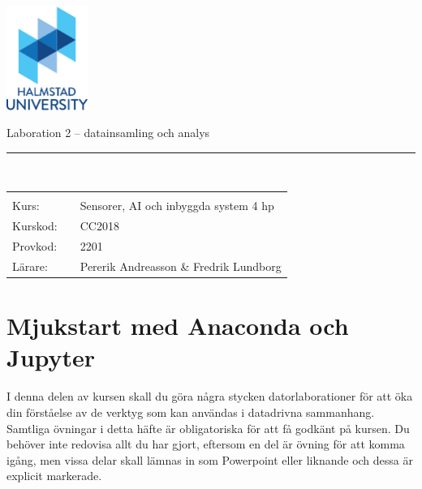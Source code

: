 \documentclass{article}
\newcommand{\kursnamn}{Sensorer, AI och inbyggda system 4 hp}
\newcommand{\kurskod}{CC2018}
\newcommand{\provkod}{2201}
\begin{document}
\setcounter{page}{1}

  \includegraphics[width=0.2\textwidth]{figures/HH_ENG_color_small.pdf}
	\begin{center}
	{\Huge{}Laboration 2 -- datainsamling och analys}
	\end{center}
\noindent\rule{\textwidth}{2pt}
\\


{\Large

\begin{tabular}{p{2cm}p{1cm}p{10cm}}
&  &  \\
Kurs: & 	& 	\kursnamn \\
Kurskod: & & \kurskod \\
Provkod: &  & \provkod \\
L\"arare: &  & Pererik Andreasson \& Fredrik Lundborg\\
\end{tabular}






}
\pagebreak

\tableofcontents

\section{Mjukstart med Anaconda och Jupyter}
I denna delen av kursen skall du göra några stycken datorlaborationer för att öka din förståelse av de verktyg som kan användas i datadrivna sammanhang. 
Samtliga övningar i detta häfte är obligatoriska för att få godkänt på kursen. Du behöver inte redovisa allt du har gjort, eftersom en del är övning för att komma igång, men vissa delar skall lämnas in som Powerpoint eller liknande och dessa är explicit markerade.
\end{document}
